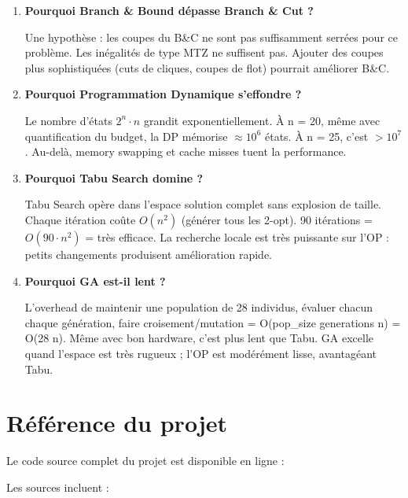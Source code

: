 \documentclass[11pt,a4paper]{article}
\begin{document}
\begin{enumerate}
    \item \textbf{Pourquoi Branch \& Bound dépasse Branch \& Cut ?} 
    
    Une hypothèse : les coupes du B\&C ne sont pas suffisamment serrées pour ce problème. Les inégalités de type MTZ ne suffisent pas. Ajouter des coupes plus sophistiquées (cuts de cliques, coupes de flot) pourrait améliorer B\&C.
    
    \item \textbf{Pourquoi Programmation Dynamique s'effondre ?}
    
    Le nombre d'états $2^n \cdot n$ grandit exponentiellement. À n = 20, même avec quantification du budget, la DP mémorise $\approx 10^6$ états. À n = 25, c'est $> 10^7$. Au-delà, memory swapping et cache misses tuent la performance.
    
    \item \textbf{Pourquoi Tabu Search domine ?}
    
    Tabu Search opère dans l'espace solution complet sans explosion de taille. Chaque itération coûte $O(n^2)$ (générer tous les 2-opt). 90 itérations = $O(90 \cdot n^2)$ = très efficace. La recherche locale est très puissante sur l'OP : petits changements produisent amélioration rapide.
    
    \item \textbf{Pourquoi GA est-il lent ?}
    
    L'overhead de maintenir une population de 28 individus, évaluer chacun chaque génération, faire croisement/mutation = O(pop\_size \cdot generations \cdot n) = O(28  \cdot n). Même avec bon hardware, c'est plus lent que Tabu. GA excelle quand l'espace est très rugueux ; l'OP est modérément lisse, avantagéant Tabu.
\end{enumerate}

\section{Référence du projet}

Le code source complet du projet est disponible en ligne :

\begin{center}
\end{center}

Les sources incluent :
\end{document}
